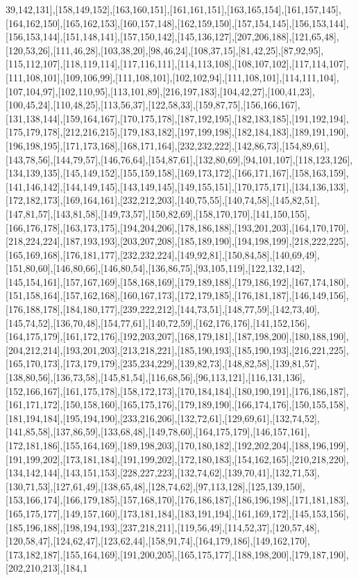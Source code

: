 39,142,131],[158,149,152],[163,160,151],[161,161,151],[163,165,154],[161,157,145],[164,162,150],[165,162,153],[160,157,148],[162,159,150],[157,154,145],[156,153,144],[156,153,144],[151,148,141],[157,150,142],[145,136,127],[207,206,188],[121,65,48],[120,53,26],[111,46,28],[103,38,20],[98,46,24],[108,37,15],[81,42,25],[87,92,95],[115,112,107],[118,119,114],[117,116,111],[114,113,108],[108,107,102],[117,114,107],[111,108,101],[109,106,99],[111,108,101],[102,102,94],[111,108,101],[114,111,104],[107,104,97],[102,110,95],[113,101,89],[216,197,183],[104,42,27],[100,41,23],[100,45,24],[110,48,25],[113,56,37],[122,58,33],[159,87,75],[156,166,167],[131,138,144],[159,164,167],[170,175,178],[187,192,195],[182,183,185],[191,192,194],[175,179,178],[212,216,215],[179,183,182],[197,199,198],[182,184,183],[189,191,190],[196,198,195],[171,173,168],[168,171,164],[232,232,222],[142,86,73],[154,89,61],[143,78,56],[144,79,57],[146,76,64],[154,87,61],[132,80,69],[94,101,107],[118,123,126],[134,139,135],[145,149,152],[155,159,158],[169,173,172],[166,171,167],[158,163,159],[141,146,142],[144,149,145],[143,149,145],[149,155,151],[170,175,171],[134,136,133],[172,182,173],[169,164,161],[232,212,203],[140,75,55],[140,74,58],[145,82,51],[147,81,57],[143,81,58],[149,73,57],[150,82,69],[158,170,170],[141,150,155],[166,176,178],[163,173,175],[194,204,206],[178,186,188],[193,201,203],[164,170,170],[218,224,224],[187,193,193],[203,207,208],[185,189,190],[194,198,199],[218,222,225],[165,169,168],[176,181,177],[232,232,224],[149,92,81],[150,84,58],[140,69,49],[151,80,60],[146,80,66],[146,80,54],[136,86,75],[93,105,119],[122,132,142],[145,154,161],[157,167,169],[158,168,169],[179,189,188],[179,186,192],[167,174,180],[151,158,164],[157,162,168],[160,167,173],[172,179,185],[176,181,187],[146,149,156],[176,188,178],[184,180,177],[239,222,212],[144,73,51],[148,77,59],[142,73,40],[145,74,52],[136,70,48],[154,77,61],[140,72,59],[162,176,176],[141,152,156],[164,175,179],[161,172,176],[192,203,207],[168,179,181],[187,198,200],[180,188,190],[204,212,214],[193,201,203],[213,218,221],[185,190,193],[185,190,193],[216,221,225],[165,170,173],[173,179,179],[235,234,229],[139,82,73],[148,82,58],[139,81,57],[138,80,56],[136,73,58],[145,81,54],[116,68,56],[96,113,121],[116,131,136],[152,166,167],[161,175,178],[158,172,173],[170,184,184],[180,190,191],[176,186,187],[161,171,172],[150,158,160],[165,175,176],[179,189,190],[166,174,176],[150,155,158],[181,194,184],[195,194,190],[233,216,206],[132,72,61],[129,69,61],[132,74,52],[141,85,58],[137,86,59],[133,68,48],[149,78,60],[164,175,179],[146,157,161],[172,181,186],[155,164,169],[189,198,203],[170,180,182],[192,202,204],[188,196,199],[191,199,202],[173,181,184],[191,199,202],[172,180,183],[154,162,165],[210,218,220],[134,142,144],[143,151,153],[228,227,223],[132,74,62],[139,70,41],[132,71,53],[130,71,53],[127,61,49],[138,65,48],[128,74,62],[97,113,128],[125,139,150],[153,166,174],[166,179,185],[157,168,170],[176,186,187],[186,196,198],[171,181,183],[165,175,177],[149,157,160],[173,181,184],[183,191,194],[161,169,172],[145,153,156],[185,196,188],[198,194,193],[237,218,211],[119,56,49],[114,52,37],[120,57,48],[120,58,47],[124,62,47],[123,62,44],[158,91,74],[164,179,186],[149,162,170],[173,182,187],[155,164,169],[191,200,205],[165,175,177],[188,198,200],[179,187,190],[202,210,213],[184,1